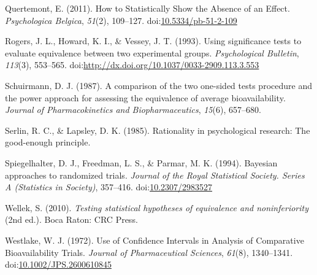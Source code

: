 \documentclass[,man,floatsintext]{apa6}
\begin{document}
\leavevmode\hypertarget{ref-quertemont_how_2011}{}%
Quertemont, E. (2011). How to Statistically Show the Absence of an Effect. \emph{Psychologica Belgica}, \emph{51}(2), 109--127. doi:\href{https://doi.org/10.5334/pb-51-2-109}{10.5334/pb-51-2-109}

\leavevmode\hypertarget{ref-rogers_using_1993}{}%
Rogers, J. L., Howard, K. I., \& Vessey, J. T. (1993). Using significance tests to evaluate equivalence between two experimental groups. \emph{Psychological Bulletin}, \emph{113}(3), 553--565. doi:\href{https://doi.org/http://dx.doi.org/10.1037/0033-2909.113.3.553}{http://dx.doi.org/10.1037/0033-2909.113.3.553}

\leavevmode\hypertarget{ref-schuirmann_comparison_1987}{}%
Schuirmann, D. J. (1987). A comparison of the two one-sided tests procedure and the power approach for assessing the equivalence of average bioavailability. \emph{Journal of Pharmacokinetics and Biopharmaceutics}, \emph{15}(6), 657--680.

\leavevmode\hypertarget{ref-serlin_rationality_1985}{}%
Serlin, R. C., \& Lapsley, D. K. (1985). Rationality in psychological research: The good-enough principle.

\leavevmode\hypertarget{ref-spiegelhalter_bayesian_1994}{}%
Spiegelhalter, D. J., Freedman, L. S., \& Parmar, M. K. (1994). Bayesian approaches to randomized trials. \emph{Journal of the Royal Statistical Society. Series A (Statistics in Society)}, 357--416. doi:\href{https://doi.org/10.2307/2983527}{10.2307/2983527}

\leavevmode\hypertarget{ref-wellek_testing_2010}{}%
Wellek, S. (2010). \emph{Testing statistical hypotheses of equivalence and noninferiority} (2nd ed.). Boca Raton: CRC Press.

\leavevmode\hypertarget{ref-westlake_use_1972}{}%
Westlake, W. J. (1972). Use of Confidence Intervals in Analysis of Comparative Bioavailability Trials. \emph{Journal of Pharmaceutical Sciences}, \emph{61}(8), 1340--1341. doi:\href{https://doi.org/10.1002/JPS.2600610845}{10.1002/JPS.2600610845}
\end{document}
